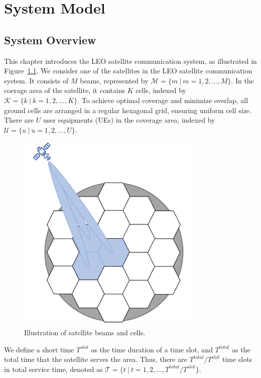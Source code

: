 \chapter{System Model}
\label{chap:model}
\section{System Overview}

This chapter introduces the LEO satellite communication system, as illustrated in Figure~\ref{fig_system}. We consider one of the satellites in the LEO satellite communication system. It consists of $M$ beams, represented by $\mathcal{M} = \{m\ |\ m = 1, 2, \ldots, M\}$. In the coerage area of the satellite, it contains $K$ cells, indexed by $\mathcal{K} = \{k\ |\ k = 1, 2, \ldots, K\}$. To achieve optimal coverage and minimize overlap, all ground cells are arranged in a regular hexagonal grid, ensuring uniform cell size. There are $U$ user equipments (UEs) in the coverage area, indexed by $\mathcal{U} = \{u\ |\ u = 1, 2, \ldots, U\}$. 

\begin{figure}[h!]
    \centering
    \includegraphics[width=0.8\textwidth]{figure/system overview2.pdf}
    \caption{Illustration of satellite beams and cells.}
    \label{fig_system}
\end{figure}
We define a short time $T^{slot}$ as the time duration of a time slot, and $T^{total}$ as the total time that the satellite serves the area. Thus, there are $T^{total} / T^{slot}$ time slots in total service time, denoted as $\mathcal{T} = \{t\ |\ t = 1, 2, \ldots, T^{total} / T^{slot}\}$.

